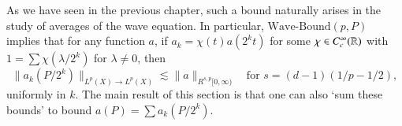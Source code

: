 As we have seen in the previous chapter, such a bound naturally arises in the study of averages of the wave equation. In particular, $\text{Wave-Bound}(p,P)$ implies that for any function $a$, if $a_k = \chi(t) a(2^k t)$ for some $\chi \in C_c^\infty(\operatorname{\mathbb{R}})$ with $1 = \sum \chi(\lambda/2^k)$ for $\lambda \neq 0$, then
%
\begin{equation}
    \| a_k(P/2^k) \|_{L^p(X) \to L^p(X)} \lesssim \| a \|_{R^{s,p}[0,\infty)} \quad\text{for $s = (d-1)(1/p - 1/2)$},
\end{equation}
%
uniformly in $k$. The main result of this section is that one can also `sum these bounds' to bound $a(P) = \sum a_k(P/2^k)$.

\thmatomicscalestheorem*


